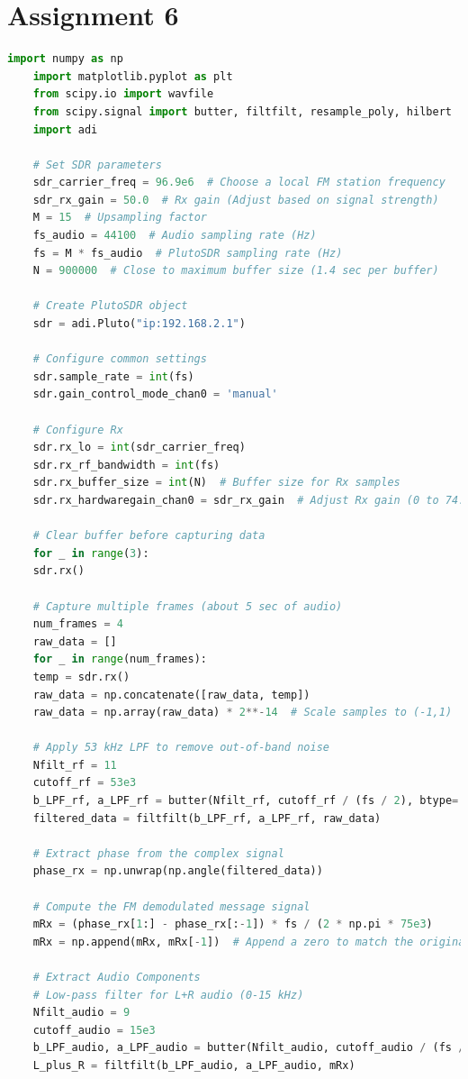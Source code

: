 \documentclass[
	letterpaper, %
	10pt, %
]{CSUniSchoolLabReport}
\begin{document}
\section{Assignment 6}

\begin{lstlisting}[language=Python]
	import numpy as np
	import matplotlib.pyplot as plt
	from scipy.io import wavfile
	from scipy.signal import butter, filtfilt, resample_poly, hilbert
	import adi
	
	# Set SDR parameters
	sdr_carrier_freq = 96.9e6  # Choose a local FM station frequency
	sdr_rx_gain = 50.0  # Rx gain (Adjust based on signal strength)
	M = 15  # Upsampling factor
	fs_audio = 44100  # Audio sampling rate (Hz)
	fs = M * fs_audio  # PlutoSDR sampling rate (Hz)
	N = 900000  # Close to maximum buffer size (1.4 sec per buffer)
	
	# Create PlutoSDR object
	sdr = adi.Pluto("ip:192.168.2.1")
	
	# Configure common settings
	sdr.sample_rate = int(fs)
	sdr.gain_control_mode_chan0 = 'manual'
	
	# Configure Rx
	sdr.rx_lo = int(sdr_carrier_freq)
	sdr.rx_rf_bandwidth = int(fs)
	sdr.rx_buffer_size = int(N)  # Buffer size for Rx samples
	sdr.rx_hardwaregain_chan0 = sdr_rx_gain  # Adjust Rx gain (0 to 74.5 dB)
	
	# Clear buffer before capturing data
	for _ in range(3):
	sdr.rx()
	
	# Capture multiple frames (about 5 sec of audio)
	num_frames = 4
	raw_data = []
	for _ in range(num_frames):
	temp = sdr.rx()
	raw_data = np.concatenate([raw_data, temp])
	raw_data = np.array(raw_data) * 2**-14  # Scale samples to (-1,1)
	
	# Apply 53 kHz LPF to remove out-of-band noise
	Nfilt_rf = 11
	cutoff_rf = 53e3
	b_LPF_rf, a_LPF_rf = butter(Nfilt_rf, cutoff_rf / (fs / 2), btype='low')
	filtered_data = filtfilt(b_LPF_rf, a_LPF_rf, raw_data)
	
	# Extract phase from the complex signal
	phase_rx = np.unwrap(np.angle(filtered_data))
	
	# Compute the FM demodulated message signal
	mRx = (phase_rx[1:] - phase_rx[:-1]) * fs / (2 * np.pi * 75e3)
	mRx = np.append(mRx, mRx[-1])  # Append a zero to match the original length
	
	# Extract Audio Components
	# Low-pass filter for L+R audio (0-15 kHz)
	Nfilt_audio = 9
	cutoff_audio = 15e3
	b_LPF_audio, a_LPF_audio = butter(Nfilt_audio, cutoff_audio / (fs / 2), btype='low')
	L_plus_R = filtfilt(b_LPF_audio, a_LPF_audio, mRx)
	

\end{lstlisting}
\end{document}
